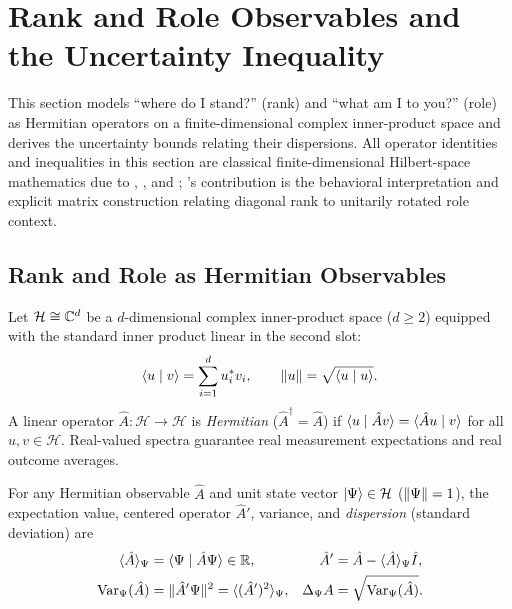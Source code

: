 \section{Rank and Role Observables and the Uncertainty Inequality}
\label{sec:uncertainty}

This section models ``where do I stand?'' (rank) and ``what am I to you?'' (role) as
Hermitian operators on a finite-dimensional complex inner-product space and derives
the uncertainty bounds relating their dispersions. All operator identities and
inequalities in this section are classical finite-dimensional Hilbert-space mathematics
due to \citet{robertson1929uncertainty}, \citet{schrodinger1930unscharfeprinzip}, and
\citet{vonneumann1955mathematical}; \RST{}'s contribution is the behavioral interpretation
and explicit matrix construction relating diagonal rank to unitarily rotated role context.

\subsection{Rank and Role as Hermitian Observables}
\label{subsec:unc-operators}

\noindent\layermath{} Let $\mathcal{H} \cong \mathbb{C}^d$ be a $d$-dimensional complex
inner-product space ($d \ge 2$) equipped with the standard inner product linear in the
second slot:
\begin{equation}
  \langle u \mid v \rangle = \sum_{i=1}^{d} u_i^* v_i,
  \qquad \lVert u \rVert = \sqrt{\langle u \mid u \rangle}.
  \label{eq:inner-product}
\end{equation}
A linear operator $\hat{A} : \mathcal{H} \to \mathcal{H}$ is \emph{Hermitian}
($\hat{A}^\dagger = \hat{A}$) if $\langle u \mid \hat{A} v \rangle = \langle \hat{A} u \mid v \rangle$ for all
$u, v \in \mathcal{H}$. Real-valued spectra guarantee real measurement expectations and
real outcome averages.

\begin{definition}
\label{def:dispersion}
For any Hermitian observable $\hat{A}$ and unit state vector $\lvert \Psi \rangle \in \mathcal{H}$
($\lVert \Psi \rVert = 1$), the expectation value, centered operator $\hat{A}'$, variance, and
\emph{dispersion} (standard deviation) are
\begin{align*}
  \langle \hat{A} \rangle_{\Psi} &= \langle \Psi \mid \hat{A}\Psi \rangle \in \mathbb{R}, &
  \hat{A}' &= \hat{A} - \langle \hat{A} \rangle_{\Psi}\hat{I}, \\
  \operatorname{Var}_{\Psi}(\hat{A}) &= \lVert \hat{A}'\Psi \rVert^2 = \langle (\hat{A}')^2 \rangle_{\Psi}, &
  \Delta_{\Psi} A &= \sqrt{\operatorname{Var}_{\Psi}(\hat{A})}.
\end{align*}
\end{definition}

